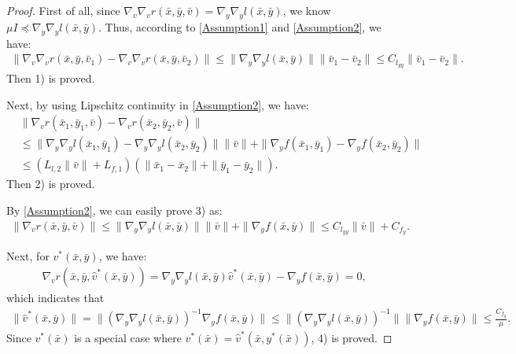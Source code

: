 \documentclass{article}
\theoremstyle{plain}
\theoremstyle{definition}
\theoremstyle{remark}
\begin{document}
\begin{proof}
First of all, since \(\nabla_{{v}}\nabla_{{v}}r(\bar{x}, \bar{y}, \bar{v}) = \nabla_{{y}}\nabla_{{y}}l(\bar{x}, \bar{y})\), we know \(\mu I \preceq \nabla_{{y}}\nabla_{{y}}l(\bar{x}, \bar{y})\). Thus, according to \cref{Assumption1} and \cref{Assumption2}, we have:
\begin{align}
    \|\nabla_{{v}}\nabla_{{v}}r(\bar{x}, \bar{y}, \bar{v}_1) - \nabla_{{v}}\nabla_{{v}}r(\bar{x}, \bar{y}, \bar{v}_2)\| \leq \|\nabla_{{y}}\nabla_{{y}}l(\bar{x}, \bar{y})\| \|\bar{v}_1 - \bar{v}_2\| \leq C_{l_{yy}} \|\bar{v}_1 - \bar{v}_2\|.\label{eq25}
\end{align}
Then 1) is proved. 

Next, by using Lipschitz continuity in \cref{Assumption2}, we have:
\begin{align}
    &\|\nabla_{{v}}r(\bar{x}_1, \bar{y}_1, \bar{v}) - \nabla_{{v}}r(\bar{x}_2, \bar{y}_2, \bar{v})\|\nonumber\\ &\leq \|\nabla_{{y}}\nabla_{{y}}l(\bar{x}_1, \bar{y}_1) - \nabla_{{y}}\nabla_{{y}}l(\bar{x}_2, \bar{y}_2)\| \|\bar{v}\| + \|\nabla_{{y}}f(\bar{x}_1, \bar{y}_1) - \nabla_{{y}}f(\bar{x}_2, \bar{y}_2)\|\nonumber \\
    &\leq (L_{l,2}\|\bar{v}\| + L_{f,1})(\|\bar{x}_1 - \bar{x}_2\| + \|\bar{y}_1 - \bar{y}_2\|).\label{eq26}
\end{align}
Then 2) is proved. 

By \cref{Assumption2}, we can easily prove 3) as:
\begin{align}
\|\nabla_{{v}}r(\bar{x}, \bar{y}, \bar{v})\| \leq \|\nabla_{{y}}\nabla_{{y}}l(\bar{x}, \bar{y})\| \|\bar{v}\| + \|\nabla_{{y}}f(\bar{x}, \bar{y})\| \leq C_{l_{yy}} \|\bar{v}\| + C_{f_y}.\label{eq27}
\end{align}

Next, for \({v}^*(\bar{x}, \bar{y})\), we have:
\begin{align}
\nabla_{{v}}r(\bar{x}, \bar{y}, \hat{v}^*(\bar{x}, \bar{y})) = \nabla_{{y}}\nabla_{{y}}l(\bar{x}, \bar{y})\hat{v}^*(\bar{x}, \bar{y}) - \nabla_{{y}}f(\bar{x}, \bar{y}) = 0,\label{eq28}
\end{align}
which indicates that
\begin{align}
\|\hat{v}^*(\bar{x}, \bar{y})\| = \|\left(\nabla_{{y}}\nabla_{{y}}l(\bar{x}, \bar{y})\right)^{-1}\nabla_{{y}}f(\bar{x}, \bar{y})\| \leq \|\left(\nabla_{{y}}\nabla_{{y}}l(\bar{x}, \bar{y})\right)^{-1}\| \|\nabla_{{y}}f(\bar{x}, \bar{y})\| \leq \frac{C_{f_y}}{\mu}.\label{eq29}
\end{align}
Since \({v}^*(\bar{x})\) is a special case where \({v}^*(\bar{x}) = \hat{v}^*(\bar{x}, {y}^*(\bar{x}))\), 4) is proved. 


\end{proof}
\end{document}
